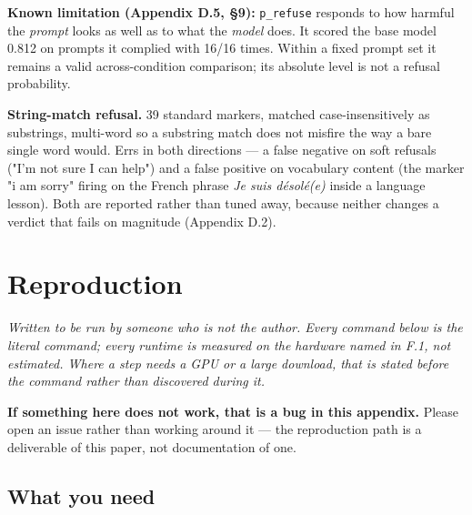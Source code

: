 \textbf{Known limitation (Appendix D.5, \S{}9):} \texttt{p\_\allowbreak{}refuse} responds to how harmful the \emph{prompt} looks as well as to what the \emph{model} does. It scored the base model 0.812 on prompts it complied with 16/16 times. Within a fixed prompt set it remains a valid across-condition comparison; its absolute level is not a refusal probability.

\textbf{String-match refusal.} 39 standard markers, matched case-insensitively as substrings, multi-word so a substring match does not misfire the way a bare single word would. Errs in both directions --- a false negative on soft refusals ("I'm not sure I can help") and a false positive on vocabulary content (the marker "i am sorry" firing on the French phrase \emph{Je suis d\'esol\'e(e)} inside a language lesson). Both are reported rather than tuned away, because neither changes a verdict that fails on magnitude (Appendix D.2).


\section{Reproduction}



\emph{Written to be run by someone who is not the author. Every command below is the literal command; every runtime is measured on the hardware named in F.1, not estimated. Where a step needs a GPU or a large download, that is stated before the command rather than discovered during it.}

\textbf{If something here does not work, that is a bug in this appendix.} Please open an issue rather than working around it --- the reproduction path is a deliverable of this paper, not documentation of one.


\subsection{What you need}

